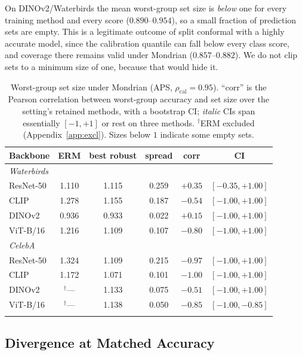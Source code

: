 \documentclass[pdflatex,sn-basic]{sn-jnl}%
\theoremstyle{thmstyleone}%
\newcommand{\rhocal}{\rho_{\mathrm{cal}}}
\begin{document}
On DINOv2/Waterbirds the mean worst-group set size is \emph{below} one for every training
method and every score ($0.890$--$0.954$), so a small fraction of prediction sets are empty. This is
a legitimate outcome of split conformal with a highly accurate model, since the calibration quantile
can fall below every class score, and coverage there remains valid under Mondrian
($0.857$--$0.882$). We do not clip sets to a minimum size of one, because that would hide it.

\begin{table}[t]
\centering
\caption{Worst-group set size under Mondrian (APS, $\rhocal=0.95$). ``corr'' is the Pearson correlation between worst-group accuracy and set size over the setting's retained methods, with a bootstrap CI; \emph{italic} CIs span essentially $[-1,+1]$ or rest on three methods. $^{\dagger}$ERM excluded (Appendix~\ref{app:excl}). Sizes below $1$ indicate some empty sets.}
\label{tab:c2}
\footnotesize
\setlength{\tabcolsep}{4pt}
\begin{tabular}{lccccc}
\toprule
Backbone & ERM & best robust & spread & corr & CI \\
\midrule
\multicolumn{6}{l}{\emph{Waterbirds}} \\
ResNet-50 & 1.110 & 1.115 & 0.259 & $+0.35$ & $[-0.35,+1.00]$ \\
CLIP & 1.278 & 1.155 & 0.187 & $-0.54$ & \emph{$[-1.00,+1.00]$} \\
DINOv2 & 0.936 & 0.933 & 0.022 & $+0.15$ & \emph{$[-1.00,+1.00]$} \\
ViT-B/16 & 1.216 & 1.109 & 0.107 & $-0.80$ & \emph{$[-1.00,+1.00]$} \\
\midrule
\multicolumn{6}{l}{\emph{CelebA}} \\
ResNet-50 & 1.324 & 1.109 & 0.215 & $-0.97$ & \emph{$[-1.00,+1.00]$} \\
CLIP & 1.172 & 1.071 & 0.101 & $-1.00$ & \emph{$[-1.00,+1.00]$} \\
DINOv2 & $^{\dagger}$--- & 1.133 & 0.075 & $-0.51$ & \emph{$[-1.00,+1.00]$} \\
ViT-B/16 & $^{\dagger}$--- & 1.138 & 0.050 & $-0.85$ & \emph{$[-1.00,-0.85]$} \\
\botrule
\end{tabular}
\end{table}

\subsection{Divergence at Matched Accuracy}
\label{sec:h1}
\end{document}
